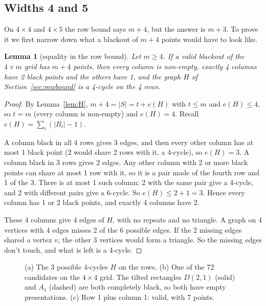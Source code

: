 \documentclass[11pt]{article}
\newtheorem{lemma}[theorem]{Lemma}
\theoremstyle{definition}
\theoremstyle{remark}
\begin{document}
\subsection{Widths 4 and 5}\label{sec:fourboundary}

On $4\times4$ and $4\times5$ the row bound says $m+4$, but the answer is $m+3$. To prove it we
first narrow down what a blackout of $m+4$ points would have to look like.

\begin{lemma}[equality in the row bound]\label{lem:fourclassification}
Let $m\ge4$. If a valid blackout of the $4\times m$ grid has $m+4$ points, then every column is
non-empty, exactly 4 columns have 2 black points and the others have 1, and the graph $H$ of
Section~\ref{sec:rowbound} is a 4-cycle on the 4 rows.
\end{lemma}

\begin{proof}
By Lemma~\ref{lem:H}, $m+4=|S|=t+e(H)$ with $t\le m$ and $e(H)\le4$, so $t=m$ (every column is
non-empty) and $e(H)=4$. Recall $e(H)=\sum_i(|B_i|-1)$.

A column black in all 4 rows gives 3 edges, and then every other column has at most 1 black
point (2 would share 2 rows with it, a 4-cycle), so $e(H)=3$. A column black in 3 rows gives 2
edges. Any other column with 2 or more black points can share at most 1 row with it, so it is a
pair made of the fourth row and 1 of the 3. There is at most 1 such column: 2 with the same pair
give a 4-cycle, and 2 with different pairs give a 6-cycle. So $e(H)\le2+1=3$. Hence every column
has 1 or 2 black points, and exactly 4 columns have 2.

These 4 columns give 4 edges of $H$, with no repeats and no triangle. A graph on 4 vertices with
4 edges misses 2 of the 6 possible edges. If the 2 missing edges shared a vertex $v$, the other 3
vertices would form a triangle. So the missing edges don't touch, and what is left is a 4-cycle.
\end{proof}

\begin{figure}[htbp]
\centering

\caption{(a) The 3 possible 4-cycles $H$ on the rows. (b) One of the 72 candidates on the
$4\times4$ grid. The tilted rectangles $D(2,1)$ (solid) and $A_1$ (dashed) are both completely
black, so both have empty presentations. (c) Row 1 plus column 1: valid, with 7 points.}
\label{fig:fourcases}
\end{figure}
\end{document}
